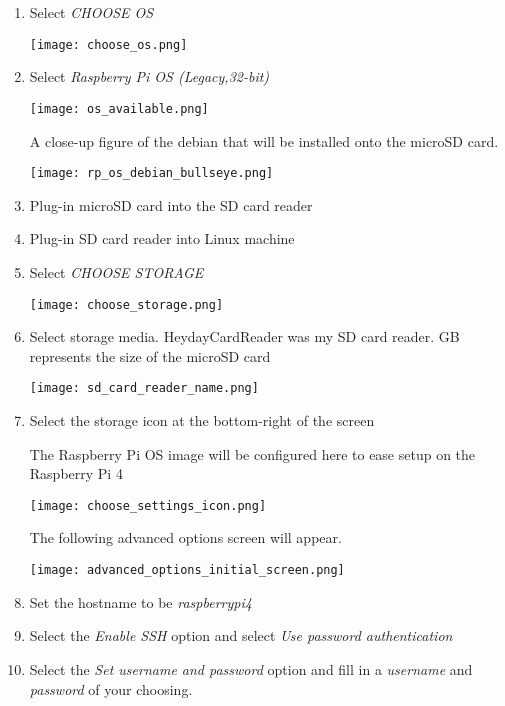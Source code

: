 \documentclass[journal]{IEEEtran}
\begin{document}
\begin{enumerate}
        \item Select \emph{CHOOSE OS}

        \texttt{[image: choose\_os.png]}
        
        \item Select \emph{Raspberry Pi OS (Legacy,32-bit)}
        
        \texttt{[image: os\_available.png]} \newline

        A close-up figure  of the debian that will be installed onto the microSD card. \newline

        \texttt{[image: rp\_os\_debian\_bullseye.png]}
        
        \item Plug-in microSD card into the SD card reader
        \item Plug-in SD card reader into Linux machine

        \item Select \emph{CHOOSE STORAGE}
        
        \texttt{[image: choose\_storage.png]}
        
        \item Select storage media. \newline
        HeydayCardReader was my SD card reader.  GB represents the size of the microSD card

        \texttt{[image: sd\_card\_reader\_name.png]}

        \item Select the storage icon at the bottom-right of the screen \newline
        
        The Raspberry Pi OS image will be configured here to ease setup on the Raspberry Pi 4

        \texttt{[image: choose\_settings\_icon.png]}

        The following advanced options screen will appear. \newline

        \texttt{[image: advanced\_options\_initial\_screen.png]}

        \item Set the hostname to be \emph{raspberrypi4}
        \item Select the \emph{Enable SSH} option and select \emph{Use password authentication}
        \item Select the \emph{Set username and password} option and fill in a \emph{username} and \emph{password} of your choosing.
        

\end{enumerate}
\end{document}
